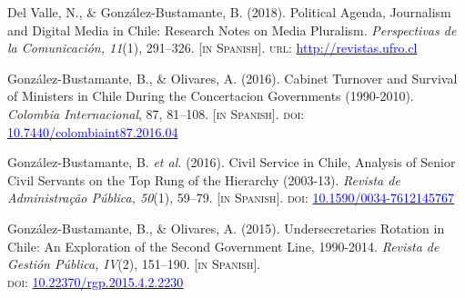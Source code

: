 \begin{publications}
\begin{benumerate}{9}
\item{\small Del Valle, N., \& Gonz\'alez-Bustamante, B. (2018). Political Agenda, Journalism and Digital Media in Chile: Research Notes on Media Pluralism. {\itshape Perspectivas de la Comunicaci\'on, 11}(1), 291--326. {\footnotesize \scshape [in Spanish]}. {\scshape url}: \href{http://revistas.ufro.cl/ojs/index.php/perspectivas/article/view/1146}{\textcolor{blue}{http://revistas.ufro.cl}}}\vspace{1mm}

\item{\small Gonz\'alez-Bustamante, B., \& Olivares, A. (2016). Cabinet Turnover and Survival of Ministers in Chile During the Concertacion Governments (1990-2010). {\itshape Colombia Internacional}, 87, 81--108. {\footnotesize \scshape [in Spanish]}. {\scshape doi}: \href{https://doi.org/10.7440/colombiaint87.2016.04}{\textcolor{blue}{10.7440/colombiaint87.2016.04}}}\vspace{1mm}

\item{\small Gonz\'alez-Bustamante, B. {\itshape et al.} (2016). Civil Service in Chile, Analysis of Senior Civil Servants on the Top Rung of the Hierarchy (2003-13). {\itshape Revista de Administra\c{c}\~ao P\'ublica, 50}(1), 59--79. {\footnotesize \scshape [in Spanish]}. {\scshape doi}: \href{http://dx.doi.org/10.1590/0034-7612145767}{\textcolor{blue}{10.1590/0034-7612145767}}} \vspace{1mm}

\item{\small Gonz\'alez-Bustamante, B., \& Olivares, A. (2015). Undersecretaries Rotation in Chile: An Exploration of the Second Government Line, 1990-2014. {\itshape Revista de Gesti\'on P\'ublica, IV}(2), 151--190. {\footnotesize \scshape [in Spanish]}. \\ {\scshape doi}: \href{https://doi.org/10.22370/rgp.2015.4.2.2230}{\textcolor{blue}{10.22370/rgp.2015.4.2.2230}}} \vspace{1mm}

\end{benumerate}

\end{publications}


